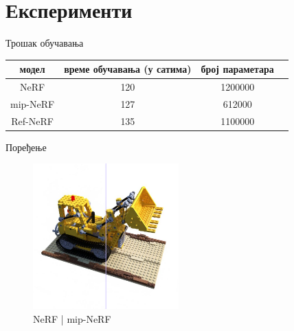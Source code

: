 \documentclass{beamer}
\begin{document}
	\section{Експерименти}
	
		\begin{frame}{Трошак обучавања}
			\begin{table}[H]
				\centering
				\begin{tabular}{cccc} \toprule
					{модел} 	& {време обучавања (у сатима)} & {број параметара} \\ \midrule
					{NeRF} 		& 120 						   & 1200000\\ 
					{mip-NeRF} 	& 127 						   & 612000\\
					{Ref-NeRF} 	& 135 						   & 1100000\\ \bottomrule
				\end{tabular}
			\end{table}
		\end{frame}
	
		\begin{frame}{Поређење}
			\begin{figure}
				\centering
				\includegraphics[width=0.5\textwidth]{img/comparison/mipnerf_vs_nerf_lego_31.png}
				\caption{NeRF | mip-NeRF}
			\end{figure}
		\end{frame}
\end{document}
